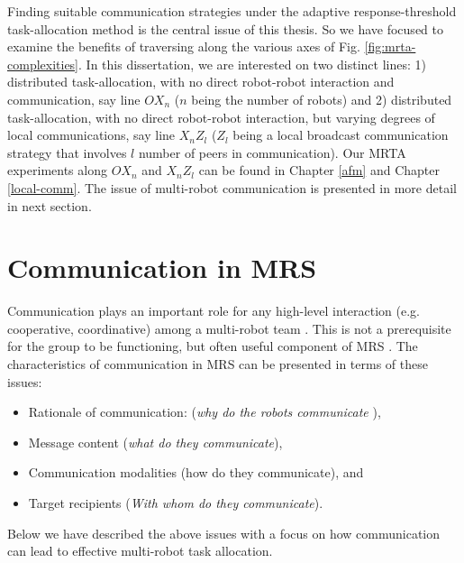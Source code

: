Finding suitable communication strategies under the adaptive response-threshold task-allocation method is the central issue of this thesis. So we have focused to examine the benefits of traversing along the various axes of Fig. \ref{fig:mrta-complexities}. In this dissertation, we are interested on two distinct lines: 1) distributed task-allocation, with no direct robot-robot interaction and communication, say line $OX_{n}$ ($n$ being the number of robots)  and 2) distributed task-allocation, with no direct robot-robot interaction, but varying degrees of local communications, say line $X_{n}Z_{l}$  ($Z_{l}$ being a local broadcast communication strategy that involves $l$ number of peers in communication). Our MRTA experiments along $OX_{n}$ and $X_{n}Z_{l}$ can be found in Chapter \ref{afm} and Chapter \ref{local-comm}. The issue of multi-robot communication is presented in more detail  in next section.
\section{Communication in MRS}
\label{bg:mrs-comm}
Communication plays an important role for any high-level interaction (e.g. cooperative, coordinative) among a multi-robot team \cite{Arkin1998}. This is not a prerequisite for the group to be functioning, but often useful component of MRS \cite{Mataric2007}. The characteristics of communication in MRS can be presented in terms of these issues:
\begin{itemize}
\item Rationale of communication: ({\em why do the robots communicate }), 
\item Message content ({\em what do they communicate}), 
\item Communication modalities (how do they communicate), and 
\item Target recipients ({\em With whom do they communicate}). 
\end{itemize}
Below we have described the above issues with a focus on how communication  can lead to effective multi-robot task allocation.
